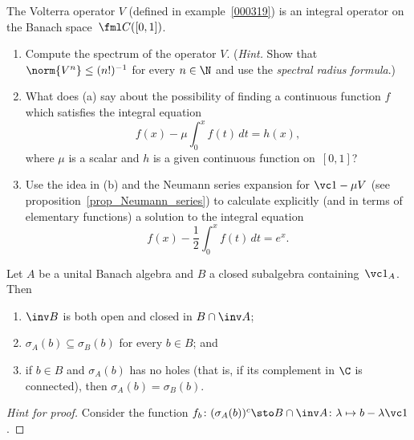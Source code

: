 \begin{exer} The Volterra operator $V$ (defined in example~\ref{000319}) is an
integral operator on the Banach space~$\fml C([0,1])$.
 \begin{enumerate}
  \item[(a)] Compute the spectrum of the operator $V$.  (\emph{Hint.} Show that $\norm{V^n}
\le (n!)^{-1}$ for every $n \in \N$ and use the \emph{spectral radius formula}.)
  \item[(b)] What does (a) say about the possibility of finding a continuous function $f$ which
satisfies the integral equation
   \[ f(x) - \mu\int_0^xf(t)\,dt = h(x), \]
where $\mu$ is a scalar and $h$ is a given continuous function on~$[0,1]$?
  \item[(c)] Use the idea in (b) and the Neumann series expansion for $\vc 1 - \mu V$ (see
proposition~\ref{prop_Neumann_series}) to calculate explicitly (and in terms of elementary functions)
a solution to the integral equation
 \[f(x) - {\textstyle \frac12}\int_0^xf(t)\,dt = e^x.\]
 \end{enumerate}
\end{exer}

\begin{prop} Let $A$ be a unital Banach algebra and $B$ a closed subalgebra containing~$\vc 1_A$.
Then
 \begin{enumerate}[label=\rm{(\alph*)}]
   \item $\inv B$ is both open and closed in $B \cap \inv A$;
   \item $\sigma_A(b) \subseteq \sigma_B(b)$ for every $b \in B$; and
   \item if $b \in B$ and $\sigma_A(b)$ has no holes (that is, if its complement in $\C$ is
connected), then $\sigma_A(b) =    \sigma_B(b)$.
 \end{enumerate}
\end{prop}

\begin{proof}[\emph{Hint for proof}] Consider the function
$f_b\colon (\sigma_A(b))^c \sto B \cap \inv A\colon \lambda \mapsto b - \lambda \vc 1$.   \ns
\end{proof}















